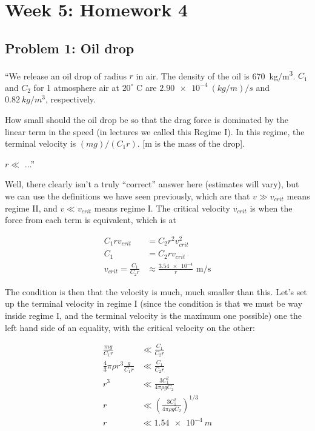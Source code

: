 \documentclass[8.01x]{subfiles}
\begin{document}
\chapter{Week 5: Homework 4}

\section{Problem 1: Oil drop}

``We release an oil drop of radius $r$ in air. The density of the oil is \SI{670}{kg/m^3}. $C_1$ and $C_2$ for 1 atmosphere air at $20^\circ$ C are $\SI{2.90e-4}{(kg/m)/s}$ and $\SI{0.82}{kg/m^3}$, respectively.

How small should the oil drop be so that the drag force is dominated by the linear term in the speed (in lectures we called this Regime I). In this regime, the terminal velocity is $(m g)/(C_1 r)$. [m is the mass of the drop].

$r \ll$ ...''

Well, there clearly isn't a truly ``correct'' answer here (estimates will vary), but we can use the definitions we have seen previously, which are that $v \gg v_{crit}$ means regime II, and $v \ll v_{crit}$ means regime I. The critical velocity $v_{crit}$ is when the force from each term is equivalent, which is at

\begin{align}
C_1 r v_{crit} &= C_2 r^2 v_{crit}^2\\
C_1 &= C_2 r v_{crit}\\
v_{crit} = \frac{C_1}{C_2 r} &\approx \frac{\num{3.54e-4}}{r} \text{ m/s}
\end{align}

The condition is then that the velocity is much, much smaller than this. Let's set up the terminal velocity in regime I (since the condition is that we must be way inside regime I, and the terminal velocity is the maximum one possible) one the left hand side of an equality, with the critical velocity on the other:

\begin{align}
\frac{m g}{C_1 r} &\ll \frac{C_1}{C_2 r}\\
\frac{4}{3} \pi \rho r^3 \frac{g}{C_1 r} &\ll \frac{C_1}{C_2 r}\\
r^3 &\ll \frac{3 C_1^2}{4 \pi \rho g C_2}\\
r &\ll \left(\frac{3 C_1^2}{4 \pi \rho g C_2}\right)^{1/3}\\
r &\ll \SI{1.54e-4}{m}
\end{align}
\end{document}
